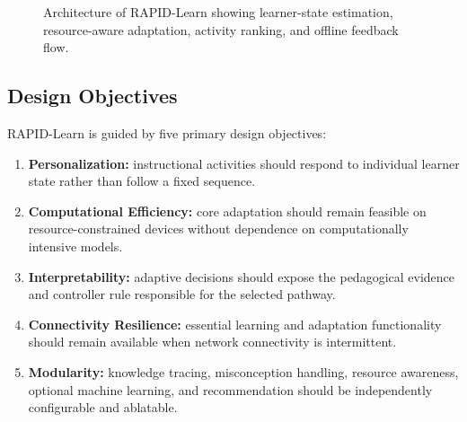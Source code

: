 \documentclass[conference]{IEEEtran}
\begin{document}
\begin{figure}[t]
{
}

\caption{Architecture of RAPID-Learn showing learner-state estimation, resource-aware adaptation, activity ranking, and offline feedback flow.}
\label{fig:rapid_architecture}
\end{figure}

\subsection{Design Objectives}

RAPID-Learn is guided by five primary design objectives:

\begin{enumerate}
    \item \textbf{Personalization:} instructional activities should respond to individual learner state rather than follow a fixed sequence.

    \item \textbf{Computational Efficiency:} core adaptation should remain feasible on resource-constrained devices without dependence on computationally intensive models.

    \item \textbf{Interpretability:} adaptive decisions should expose the pedagogical evidence and controller rule responsible for the selected pathway.

    \item \textbf{Connectivity Resilience:} essential learning and adaptation functionality should remain available when network connectivity is intermittent.

    \item \textbf{Modularity:} knowledge tracing, misconception handling, resource awareness, optional machine learning, and recommendation should be independently configurable and ablatable.
\end{enumerate}
\end{document}
